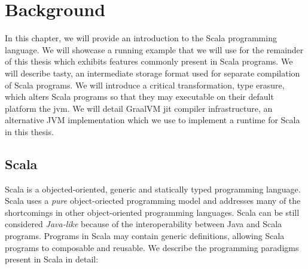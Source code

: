 \chapter{Background}

In this chapter, we will provide an introduction to the Scala programming language. 
We will showcase a running example that we will use for the remainder of this thesis which exhibits features commonly present in Scala programs. 
We will describe \acrfull{tasty}, an intermediate storage format used for separate compilation\cite{???} of Scala programs. 
We will introduce a critical transformation, type erasure, which alters Scala programs so that they may executable on their default platform the \acrfull{jvm}. 
We will detail GraalVM \acrfull{jit} compiler infrastructure, an alternative JVM implementation which we use to implement a runtime for Scala in this thesis.

\section{Scala}

Scala\cite{scala:overview} is a objected-oriented, generic and statically typed programming language.
Scala uses a \textit{pure} object-oriected programming model\cite{smalltalk:design} and addresses many of the shortcomings\cite{go4:design-patterns} in other object-oriented programming languages.
Scala can be still considered \textit{Java-like} because of the interoperability between Java and Scala programs.
Programs in Scala may contain generic definitions, allowing Scala programs to composable and reusable\cite{scala:origins}.
We describe the programming paradigms present in Scala in detail:

